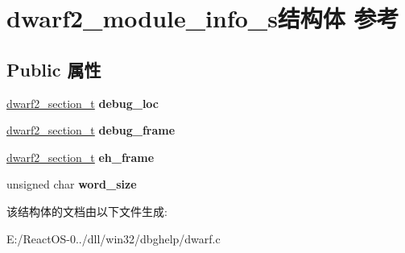 \hypertarget{structdwarf2__module__info__s}{}\section{dwarf2\+\_\+module\+\_\+info\+\_\+s结构体 参考}
\label{structdwarf2__module__info__s}
\subsection*{Public 属性}
\begin{DoxyCompactItemize}
\item 
\mbox{\label{structdwarf2__module__info__s_a7fd60a53cfafed98eaba6aa142e55e1c}} 
\hyperlink{structdwarf2__section__s}{dwarf2\+\_\+section\+\_\+t} {\bfseries debug\+\_\+loc}
\item 
\mbox{\label{structdwarf2__module__info__s_a527e2730f1c001a98f631cdb211d2554}} 
\hyperlink{structdwarf2__section__s}{dwarf2\+\_\+section\+\_\+t} {\bfseries debug\+\_\+frame}
\item 
\mbox{\label{structdwarf2__module__info__s_ae015d7de210d5560294448a5ac530d10}} 
\hyperlink{structdwarf2__section__s}{dwarf2\+\_\+section\+\_\+t} {\bfseries eh\+\_\+frame}
\item 
\mbox{\label{structdwarf2__module__info__s_a3fc22e1804f3cc98cd745988d0bca7e5}} 
unsigned char {\bfseries word\+\_\+size}
\end{DoxyCompactItemize}


该结构体的文档由以下文件生成\+:\begin{DoxyCompactItemize}
\item 
E\+:/\+React\+O\+S-\/0../dll/win32/dbghelp/dwarf.\+c\end{DoxyCompactItemize}
